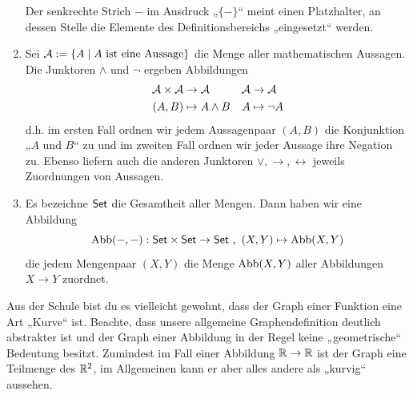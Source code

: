 \begin{bsp}
\begin{enumerate}
        Der senkrechte Strich $-$ im Ausdruck „$\{-\}$“ meint einen Platzhalter, an dessen Stelle die Elemente des Definitionsbereichs „eingesetzt“ werden.
        \item Sei $\mathcal A:=\{A\mid A\ \text{ist eine Aussage}\}$ die Menge aller mathematischen Aussagen. Die Junktoren $\land$ und $\neg$ ergeben Abbildungen
        \begin{align*}
            \mathcal A\times \mathcal A & \to \mathcal A & \mathcal A & \to \mathcal A \\
            (A,B) & \mapsto A\land B & A& \mapsto \neg A
        \end{align*}
        d.h. im ersten Fall ordnen wir jedem Aussagenpaar $(A,B)$ die Konjunktion „$A$ und $B$“ zu und im zweiten Fall ordnen wir jeder Aussage ihre Negation zu. Ebenso liefern auch die anderen Junktoren $\lor,\to,\leftrightarrow$ jeweils Zuordnungen von Aussagen.
        \item Es bezeichne $\mathsf{Set}$ die Gesamtheit aller Mengen. Dann haben wir eine Abbildung
            \[ \operatorname{Abb}(-,-) : \mathsf{Set} \times \mathsf{Set} \to \mathsf{Set} \ ,\ (X,Y) \mapsto \operatorname{Abb}(X,Y) \]
        die jedem Mengenpaar $(X,Y)$ die Menge $\operatorname{Abb}(X,Y)$ aller Abbildungen $X\to Y$ zuordnet.
    \end{enumerate}
    Aus der Schule bist du es vielleicht gewohnt, dass der Graph einer Funktion eine Art „Kurve“ ist. Beachte, dass unsere allgemeine Graphendefinition deutlich abstrakter ist und der Graph einer Abbildung in der Regel keine „geometrische“ Bedeutung besitzt. Zumindest im Fall einer Abbildung $\mathbb R\to \mathbb R$ ist der Graph eine Teilmenge des $\mathbb R^2$, im Allgemeinen kann er aber alles andere als „kurvig“ aussehen.
\end{bsp}


